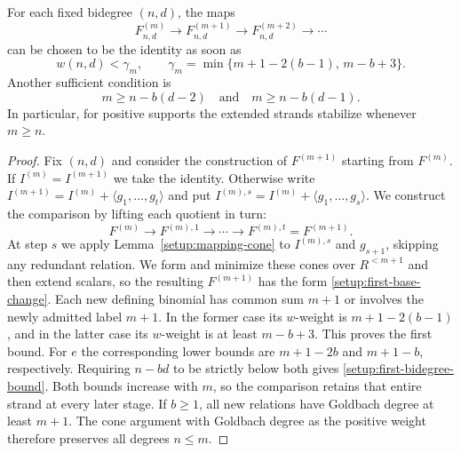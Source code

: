 \begin{theorem}
\label{setup:first-stabilization}
For each fixed bidegree $(n,d)$, the maps
\[
 F^{(m)}_{n,d}\longrightarrow F^{(m+1)}_{n,d}
              \longrightarrow F^{(m+2)}_{n,d}\longrightarrow\cdots
\]
can be chosen to be the identity as soon as
\[
 w(n,d)<\gamma_m,\qquad
 \gamma_m=\min\{m+1-2(b-1),\,m-b+3\}.
\]
Another sufficient condition is
\begin{equation}\label{setup:first-bidegree-bound}
 m\ge n-b(d-2)\quad\text{and}\quad m\ge n-b(d-1).
\end{equation}
In particular, for positive supports the extended strands stabilize
whenever $m\ge n$.
\end{theorem}
\begin{proof}
Fix $(n,d)$ and consider the construction of $F^{(m+1)}$ starting
from $F^{(m)}$. If $I^{(m)}=I^{(m+1)}$ we take the identity.
Otherwise write $I^{(m+1)}=I^{(m)}+\langle g_1,\ldots,g_t\rangle$
and put $I^{(m),s}=I^{(m)}+\langle g_1,\ldots,g_s\rangle$.
We construct the comparison by lifting each quotient in turn:
\[
 F^{(m)}\longrightarrow F^{(m),1}\longrightarrow\cdots
 \longrightarrow F^{(m),t}=F^{(m+1)}.
\]
At step $s$ we apply Lemma~\ref{setup:mapping-cone} to $I^{(m),s}$
and $g_{s+1}$, skipping any redundant relation. We form and minimize
these cones over $R^{<m+1}$ and then extend scalars, so the resulting
$F^{(m+1)}$ has the form \eqref{setup:first-base-change}. Each new defining
binomial has common sum $m+1$ or involves the newly admitted label
$m+1$. In the former case its $w$-weight is $m+1-2(b-1)$, and in the
latter case its $w$-weight is at least $m-b+3$. This proves the first
bound. For $e$ the corresponding lower bounds are $m+1-2b$ and
$m+1-b$, respectively. Requiring $n-bd$ to be strictly below both
gives \eqref{setup:first-bidegree-bound}. Both bounds increase with
$m$, so the comparison retains that entire strand at every later
stage. If $b\ge1$, all new relations have Goldbach degree at least
$m+1$. The cone argument with Goldbach degree as the positive weight
therefore preserves all degrees $n\le m$.
\end{proof}

